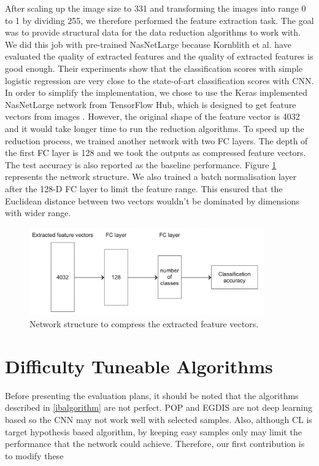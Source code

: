 After scaling up the image size to 331 and transforming the images into range 0 to 1 by dividing 255, we therefore performed the feature extraction task. The goal was to provide structural data for the data reduction algorithms to work with. We did this job with pre-trained NasNetLarge \cite{Zoph2018} because Kornblith et al. \cite{Kornblith2018} have evaluated the quality of extracted features and the quality of extracted features is good enough. Their experiments show that the classification scores with simple logistic regression are very close to the state-of-art classification scores with CNN. In order to simplify the implementation, we chose to use the Keras implemented NasNetLarge network from TensorFlow Hub, which is designed to get feature vectors from images \cite{tensorhub_nasnet}. However, the original shape of the feature vector is 4032 and it would take longer time to run the reduction algorithms. To speed up the reduction process, we trained another network with two FC layers. The depth of the first FC layer is 128 and we took the outputs as compressed feature vectors. The test accuracy is also reported as the baseline performance. Figure \ref{Fig.compress_layer} represents the network structure. We also trained a batch normalisation layer after the 128-D FC layer to limit the feature range. This ensured that the Euclidean distance between two vectors wouldn't be dominated by dimensions with wider range.


 \begin{figure}[H]
 \centering
 \includegraphics[width=0.9\textwidth]{src/compress_layer.png}
 \caption{Network structure to compress the extracted feature vectors.}
 \label{Fig.compress_layer}
 \end{figure}

\section{Difficulty Tuneable Algorithms}
Before presenting the evaluation plans, it should be noted that the algorithms described in \ref{ibalgorithm} are not perfect. POP and EGDIS are not deep learning based so the CNN may not work well with selected samples. Also, although CL is target hypothesis based algorithm, by keeping easy samples only may limit the performance that the network could achieve. Therefore, our first contribution is to modify these 

